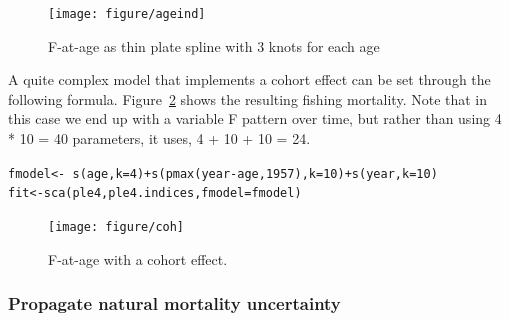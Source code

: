 \documentclass[a4paper,english,10pt]{article}\usepackage[]{graphicx}\usepackage[]{color}
\makeatletter
\newcommand{\hlnum}[1]{\textcolor[rgb]{0.2,0.2,0.2}{#1}}%
\newcommand{\hlopt}[1]{\textcolor[rgb]{0.2,0.2,0.2}{#1}}%
\newcommand{\hlstd}[1]{\textcolor[rgb]{0,0,0}{#1}}%
\newcommand{\hlkwb}[1]{\textcolor[rgb]{0.361,0.506,0.596}{#1}}%
\newcommand{\hlkwc}[1]{\textcolor[rgb]{0.361,0.506,0.596}{#1}}%
\newcommand{\hlkwd}[1]{\textcolor[rgb]{0.361,0.506,0.596}{#1}}%
\newenvironment{kframe}{%
 \def\at@end@of@kframe{}%
 \ifinner\ifhmode%
  \def\at@end@of@kframe{\end{minipage}}%
  \begin{minipage}{\columnwidth}%
 \fi\fi%
 \def\FrameCommand##1{\hskip\@totalleftmargin \hskip-\fboxsep
 \colorbox{shadecolor}{##1}\hskip-\fboxsep
     \hskip-\linewidth \hskip-\@totalleftmargin \hskip\columnwidth}%
 \MakeFramed {\advance\hsize-\width
   \@totalleftmargin\z@ \linewidth\hsize
   \@setminipage}}%
 {\par\unskip\endMakeFramed%
 \at@end@of@kframe}
\newenvironment{knitrout}{}{} %
\makeatother
\begin{document}
\begin{knitrout}
\color{fgcolor}\begin{figure}[H]


{\centering \texttt{[image: figure/ageind]} 

}

\caption[F-at-age as thin plate spline with 3 knots for each age]{F-at-age as thin plate spline with 3 knots for each age\label{fig:ageind}}
\end{figure}


\end{knitrout}

A quite complex model that implements a cohort effect can be set through the following formula. Figure~\ref{fig:coh} shows the resulting fishing mortality. Note that in this case we end up with a variable F pattern over time, but rather than using 4 * 10 = 40 parameters, it uses, 4 + 10 + 10 = 24.

\begin{knitrout}
\color{fgcolor}\begin{kframe}
\begin{alltt}
\hlstd{fmodel} \hlkwb{<-} \hlopt{~} \hlkwd{s}\hlstd{(age,} \hlkwc{k} \hlstd{=} \hlnum{4}\hlstd{)} \hlopt{+} \hlkwd{s}\hlstd{(}\hlkwd{pmax}\hlstd{(year} \hlopt{-} \hlstd{age,} \hlnum{1957}\hlstd{),} \hlkwc{k} \hlstd{=} \hlnum{10}\hlstd{)} \hlopt{+} \hlkwd{s}\hlstd{(year,} \hlkwc{k} \hlstd{=} \hlnum{10}\hlstd{)}
\hlstd{fit} \hlkwb{<-} \hlkwd{sca}\hlstd{(ple4, ple4.indices,} \hlkwc{fmodel}\hlstd{=fmodel)}
\end{alltt}
\end{kframe}
\end{knitrout}

\begin{knitrout}
\color{fgcolor}\begin{figure}[H]


{\centering \texttt{[image: figure/coh]} 

}

\caption[F-at-age with a cohort effect]{F-at-age with a cohort effect.\label{fig:coh}}
\end{figure}


\end{knitrout}

\subsubsection{Propagate natural mortality uncertainty}
\end{document}
